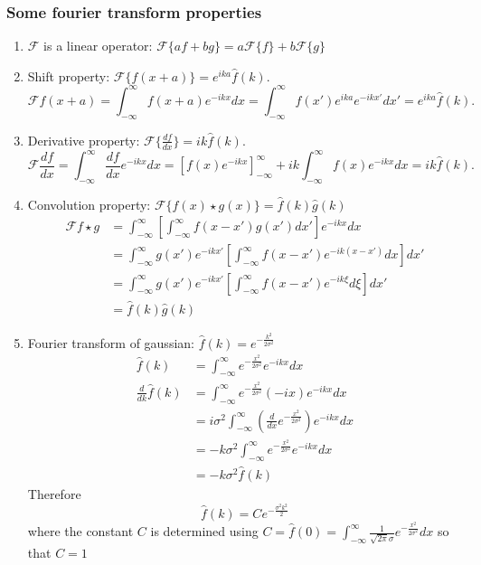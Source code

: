 \documentclass[11pt,a4paper,noindent]{article}
\begin{document}
\subsubsection*{Some fourier transform properties}
\begin{enumerate}
\item $\mathcal{F}$ is a linear operator: $\mathcal{F}\{af + bg\} = a\mathcal{F}\{f\} + b\mathcal{F}\{g\}$
\item Shift property: $\mathcal{F}\{f(x+a)\} = e^{ika} \hat{f}(k).$
\begin{equation}
\mathcal{F}{f(x+a)} = \int_{-\infty}^{\infty} f(x+a) e^{-ikx} dx
 				    = \int_{-\infty}^{\infty} f(x') e^{ika} e^{-ikx'} dx'
 				   = e^{ika} \hat{f}(k).
\end{equation}
\item Derivative property: $\mathcal{F}\{\frac{df}{dx}\} = ik \hat{f}(k).$
\begin{equation}
\mathcal{F}{\frac{df}{dx}} = \int_{-\infty}^{\infty} \frac{df}{dx} e^{-ikx} dx
= \left[f(x)e^{-ikx}\right]^\infty_{-\infty}+ik\int_{-\infty}^{\infty}f(x)e^{-ikx}dx
 				   = ik\hat{f}(k).
\end{equation}
\item Convolution property: $\mathcal{F}\{f(x) \star g(x)\} = \hat{f}(k)\hat{g}(k)$
\begin{align}
\mathcal{F}{f \star g} &= \int_{-\infty}^{\infty} \left [ \int_{-\infty}^{\infty} f(x-x')g(x')dx' \right ] e^{-ikx} dx \\
&= \int_{-\infty}^{\infty} g(x') e^{-ikx'} \left [ \int_{-\infty}^{\infty} f(x-x')e^{-ik(x-x')}dx \right ]  dx' \\
&= \int_{-\infty}^{\infty} g(x') e^{-ikx'} \left [ \int_{-\infty}^{\infty} f(x-x')e^{-ik\xi}d\xi \right ]  dx' \\
&= \hat{f}(k)\hat{g}(k)
\end{align}

\item Fourier transform of gaussian: $\hat{f}(k) = e^{-\frac{k^2}{2\sigma^2}}$
\begin{align}
\hat{f}(k) &= \int_{-\infty}^{\infty}  e^{-\frac{x^2}{2\sigma^2}} e^{-ikx} dx \\
\frac{d}{dk} \hat{f}(k) &=  \int_{-\infty}^{\infty}  e^{-\frac{x^2}{2\sigma^2}} (-ix) e^{-ikx} dx \\
&= i\sigma^2 \int_{-\infty}^{\infty}  \left(\frac{d}{dx} e^{-\frac{x^2}{2\sigma^2}}\right)  e^{-ikx} dx \\
&= -k\sigma^2 \int_{-\infty}^{\infty}  e^{-\frac{x^2}{2\sigma^2}} e^{-ikx} dx \\
&= -k\sigma^2 \hat{f}(k)
\end{align}
Therefore
\begin{equation}
\hat{f}(k) = C e^{-\frac{\sigma^2 k^2}{2}}
\end{equation}
where the constant $C$ is determined using $C = \hat{f}(0) = \int_{-\infty}^{\infty} \frac{1}{\sqrt{2\pi} \sigma} e^{-\frac{x^2}{2\sigma^2}} dx$ so that $C = 1$
\end{enumerate}
\end{document}

